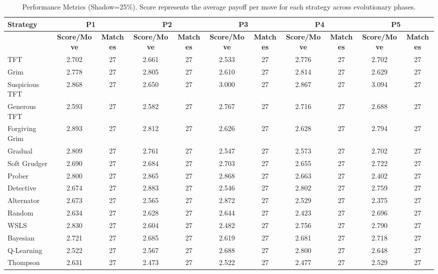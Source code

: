 \begin{table}
\centering
\scriptsize
\caption{Performance Metrics (Shadow=25\%). Score represents the average payoff per move for each strategy across evolutionary phases.}
\label{tab:experiment_20250812_192959_performance}
\begin{tabular}{|l|cc|cc|cc|cc|cc|}
\hline
\textbf{Strategy} & \multicolumn{2}{c|}{\textbf{P1}} & \multicolumn{2}{c|}{\textbf{P2}} & \multicolumn{2}{c|}{\textbf{P3}} & \multicolumn{2}{c|}{\textbf{P4}} & \multicolumn{2}{c|}{\textbf{P5}} \\
\hline
 & \textbf{Score/Move} & \textbf{Matches} & \textbf{Score/Move} & \textbf{Matches} & \textbf{Score/Move} & \textbf{Matches} & \textbf{Score/Move} & \textbf{Matches} & \textbf{Score/Move} & \textbf{Matches} \\
\hline
TFT & 2.702 & 27 & 2.661 & 27 & 2.533 & 27 & 2.776 & 27 & 2.702 & 27 \\
Grim & 2.778 & 27 & 2.805 & 27 & 2.610 & 27 & 2.814 & 27 & 2.629 & 27 \\
Suspicious TFT & 2.868 & 27 & 2.650 & 27 & 3.000 & 27 & 2.867 & 27 & 3.094 & 27 \\
Generous TFT & 2.593 & 27 & 2.582 & 27 & 2.767 & 27 & 2.716 & 27 & 2.688 & 27 \\
Forgiving Grim & 2.893 & 27 & 2.812 & 27 & 2.626 & 27 & 2.628 & 27 & 2.794 & 27 \\
Gradual & 2.809 & 27 & 2.761 & 27 & 2.547 & 27 & 2.573 & 27 & 2.702 & 27 \\
Soft Grudger & 2.690 & 27 & 2.684 & 27 & 2.703 & 27 & 2.655 & 27 & 2.722 & 27 \\
Prober & 2.800 & 27 & 2.865 & 27 & 2.868 & 27 & 2.663 & 27 & 2.402 & 27 \\
Detective & 2.674 & 27 & 2.883 & 27 & 2.546 & 27 & 2.802 & 27 & 2.759 & 27 \\
Alternator & 2.673 & 27 & 2.565 & 27 & 2.872 & 27 & 2.529 & 27 & 2.375 & 27 \\
Random & 2.634 & 27 & 2.628 & 27 & 2.644 & 27 & 2.423 & 27 & 2.696 & 27 \\
WSLS & 2.830 & 27 & 2.604 & 27 & 2.482 & 27 & 2.756 & 27 & 2.790 & 27 \\
Bayesian & 2.721 & 27 & 2.685 & 27 & 2.619 & 27 & 2.681 & 27 & 2.718 & 27 \\
Q-Learning & 2.522 & 27 & 2.567 & 27 & 2.688 & 27 & 2.800 & 27 & 2.648 & 27 \\
Thompson & 2.631 & 27 & 2.473 & 27 & 2.522 & 27 & 2.477 & 27 & 2.529 & 27 \\

\end{tabular}
\end{table}

